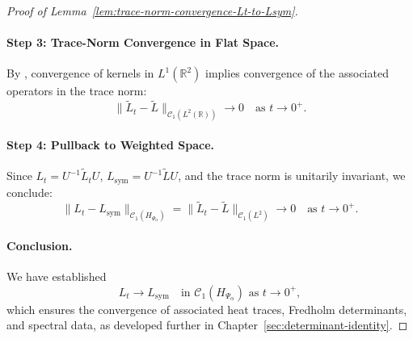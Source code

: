 \begin{proof}[Proof of Lemma~\ref{lem:trace-norm-convergence-Lt-to-Lsym}]
\paragraph{Step 3: Trace-Norm Convergence in Flat Space.}
By \cite[Thm.~3.1]{Simon2005TraceIdeals}, convergence of kernels in \( L^1(\mathbb{R}^2) \) implies convergence of the associated operators in the trace norm:
\[
\| \widetilde{L}_t - \widetilde{L} \|_{\mathcal{C}_1(L^2(\mathbb{R}))} \to 0 \quad \text{as } t \to 0^+.
\]

\paragraph{Step 4: Pullback to Weighted Space.}
Since \( L_t = U^{-1} \widetilde{L}_t U \), \( L_{\mathrm{sym}} = U^{-1} \widetilde{L} U \), and the trace norm is unitarily invariant, we conclude:
\[
\| L_t - L_{\mathrm{sym}} \|_{\mathcal{C}_1(H_{\Psi_\alpha})} = \| \widetilde{L}_t - \widetilde{L} \|_{\mathcal{C}_1(L^2)} \to 0 \quad \text{as } t \to 0^+.
\]

\paragraph{Conclusion.}
We have established
\[
L_t \to L_{\mathrm{sym}} \quad \text{in } \mathcal{C}_1(H_{\Psi_\alpha}) \text{ as } t \to 0^+,
\]
which ensures the convergence of associated heat traces, Fredholm determinants, and spectral data, as developed further in Chapter~\ref{sec:determinant-identity}.
\end{proof}
% 